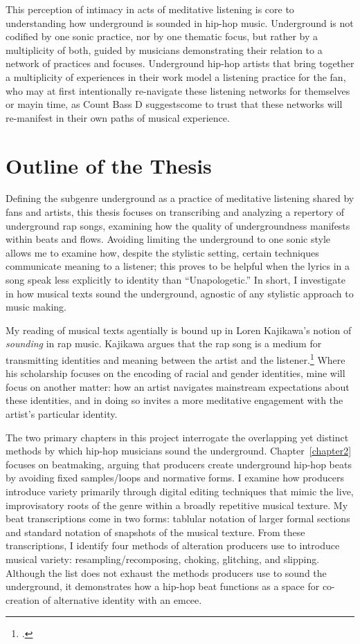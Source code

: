 This perception of intimacy in acts of meditative listening is core to understanding how underground
is sounded in hip-hop music. Underground is not codified by one sonic practice, nor by one thematic
focus, but rather by a multiplicity of both, guided by musicians demonstrating their relation to a 
network of practices and focuses. Underground hip-hop artists that bring together a multiplicity of
experiences in their work model a listening practice for the fan, who may at first intentionally re-navigate
these listening networks for themselves or may\textemdash in time, as Count Bass D suggests\textemdash come
to trust that these networks will re-manifest in their own paths of musical experience.
\clearpage

\section{Outline of the Thesis}

Defining the subgenre underground as a practice of meditative listening shared by fans and artists,
this thesis focuses on transcribing and analyzing a repertory of underground rap songs, examining
how the quality of undergroundness manifests within beats and flows. Avoiding limiting the underground
to one sonic style allows me to examine how, despite the stylistic setting, certain techniques
communicate meaning to a listener; this proves to be helpful when the lyrics in a song speak less
explicitly to identity than ``Unapologetic.'' In short, I investigate in how musical texts sound
the underground, agnostic of any stylistic approach to music making.

My reading of musical texts agentially is bound up in Loren Kajikawa's notion of \emph{sounding} 
in rap music. Kajikawa argues that the rap song is a medium for transmitting identities and meaning 
between the artist and the listener.\footnote{
    \autocite[2]{lorenkajikawaSoundingRaceRap2015}.}
Where his scholarship focuses on the encoding of racial and gender identities, mine will focus on
another matter: how an artist navigates mainstream expectations about these identities, and 
in doing so invites a more meditative engagement with the artist's particular identity.

The two primary chapters in this project interrogate the overlapping yet distinct methods by which
hip-hop musicians sound the underground. Chapter~\ref{chapter2} focuses on beatmaking, arguing that
producers create underground hip-hop beats by avoiding fixed samples/loops and normative forms. I 
examine how producers introduce variety primarily through digital editing techniques that mimic the
live, improvisatory roots of the genre within a broadly repetitive musical texture. My beat 
transcriptions come in two forms: tablular notation of larger formal sections and standard notation
of snapshots of the musical texture. From these transcriptions, I identify four methods of alteration
producers use to introduce musical variety: resampling/recomposing, choking, glitching, and slipping.
Although the list does not exhaust the methods producers use to sound the underground, it demonstrates
how a hip-hop beat functions as a space for co-creation of alternative identity with an emcee.

